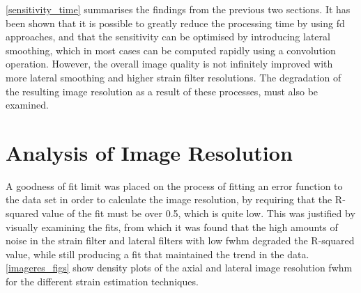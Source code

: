 \autoref{sensitivity_time} summarises the findings from the previous two sections. It has been shown that it is possible to greatly reduce the processing time by using \ac{fd} approaches, and that the sensitivity can be optimised by introducing lateral smoothing, which in most cases can be computed rapidly using a convolution operation. However, the overall image quality is not infinitely improved with more lateral smoothing and higher strain filter resolutions. The degradation of the resulting image resolution as a result of these processes, must also be examined.

\section{Analysis of Image Resolution} \label{image_res_results}

A goodness of fit limit was placed on the process of fitting an error function to the data set in order to calculate the image resolution, by requiring that the R-squared value of the fit must be over 0.5, which is quite low. This was justified by visually examining the fits, from which it was found that the high amounts of noise in the strain filter and lateral filters with low \ac{fwhm} degraded the R-squared value, while still producing a fit that maintained the trend in the data.
\autoref{imageres_figs} show density plots of the axial and lateral image resolution \ac{fwhm} for the different strain estimation techniques.


